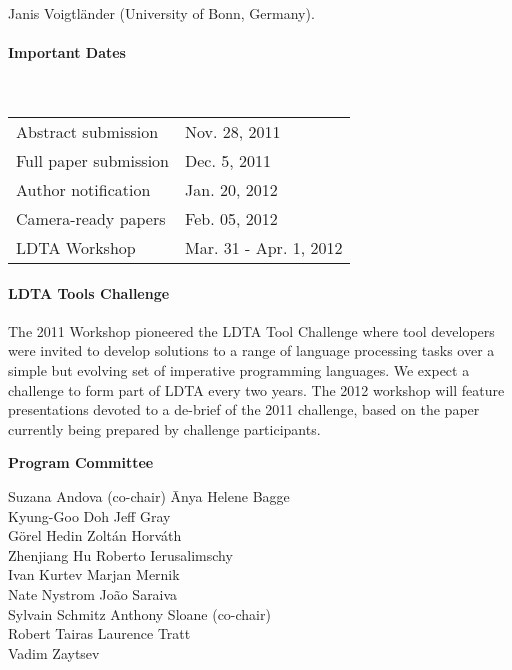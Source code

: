 \documentclass[letterpaper, twocolumn, 9pt]{article}
\begin{document}
Janis Voigtländer (University of Bonn, Germany).

\paragraph{\textsf{Important Dates}} ~

\vspace{5pt}
\hspace{-0.20in}
\begin{tabular}{ll}
Abstract submission & Nov. 28, 2011\\
Full paper submission & Dec. 5, 2011\\
Author notification & Jan. 20, 2012\\
Camera-ready papers & Feb. 05, 2012\\
LDTA Workshop & Mar. 31 - Apr. 1, 2012
\end{tabular}

\paragraph{\textsf{LDTA Tools Challenge}}
The 2011 Workshop pioneered the LDTA Tool Challenge where tool
developers were invited to develop solutions to a range of language
processing tasks over a simple but evolving set of imperative
programming languages. We expect a challenge to form part of LDTA
every two years. The 2012 workshop will feature presentations devoted
to a de-brief of the 2011 challenge, based on the paper currently
being prepared by challenge participants.

\newpage

\vspace{3pt}
\hspace{-0.20in}
{\bfseries\textsf{Program Committee}}\\
{\small
\vspace{-9pt}
\begin{tabbing}
 Suzana Andova (co-chair) \hspace{1.25cm}\= Anya Helene Bagge\\
 Kyung-Goo Doh \> Jeff Gray\\
 Görel Hedin \> Zoltán Horváth\\
 Zhenjiang Hu \> Roberto Ierusalimschy\\
 Ivan Kurtev \> Marjan Mernik \\
 Nate Nystrom \> João Saraiva\\
 Sylvain Schmitz \> Anthony Sloane (co-chair)\\
 Robert Tairas \> Laurence Tratt\\
 Vadim Zaytsev \\
\end{tabbing}
}
\end{document}
